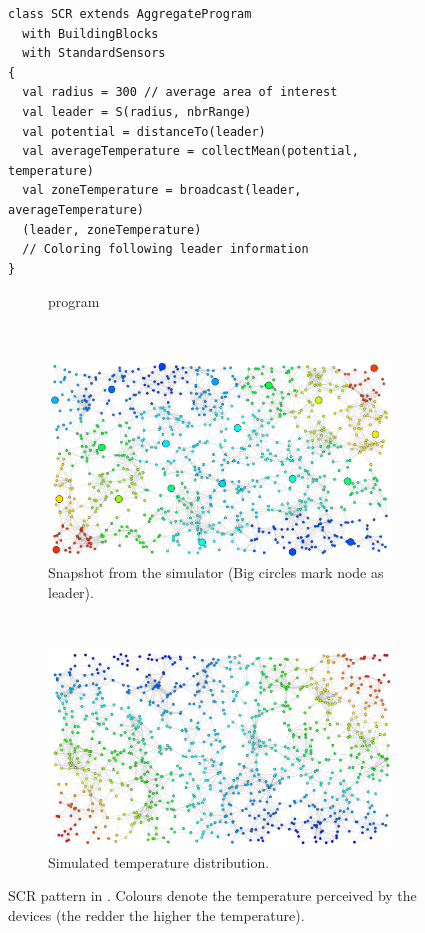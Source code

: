  \begin{figure}
  \centering
  \newsavebox{\scrprogram}
  \begin{lrbox}{\scrprogram}%
  \begin{lstlisting}[deletekeywords={[2]{nbr}}]
class SCR extends AggregateProgram 
  with BuildingBlocks 
  with StandardSensors 
{
  val radius = 300 // average area of interest
  val leader = S(radius, nbrRange) 
  val potential = distanceTo(leader)
  val averageTemperature = collectMean(potential, temperature) 
  val zoneTemperature = broadcast(leader, averageTemperature)
  (leader, zoneTemperature)
  // Coloring following leader information
}
  \end{lstlisting}
  \end{lrbox}
  \begin{subfigure}{\textwidth}
    \usebox{\scrprogram}
    \caption{\label{fig:example-scr-code}\scafi{} program}
  \end{subfigure}\\
  \begin{subfigure}{\textwidth}
    \centering
    \includegraphics[width=0.8\linewidth]{papers/softwarex2021/imgs/scr-result.png}
    \caption{\label{fig:example-scr-snapshot}Snapshot from the \scafi{} simulator (Big circles mark node as leader).}
  \end{subfigure}\\
  \begin{subfigure}{\textwidth}
    \centering
    \includegraphics[width=0.8\linewidth]{papers/softwarex2021/imgs/temperature-distribution.png}
    \caption{\label{fig:example-temperature}Simulated temperature distribution.}
  \end{subfigure}
  \caption{SCR pattern in \scafi{}. Colours denote the temperature perceived by the devices (the redder the higher the temperature).}  \label{fig:scr}
\end{figure}
  
